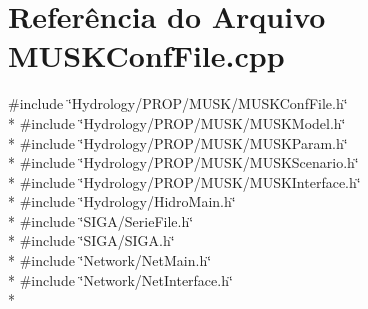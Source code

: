 \section{Referência do Arquivo M\+U\+S\+K\+Conf\+File.\+cpp}
\label{_m_u_s_k_conf_file_8cpp}
{\ttfamily \#include \char`\"{}Hydrology/\+P\+R\+O\+P/\+M\+U\+S\+K/\+M\+U\+S\+K\+Conf\+File.\+h\char`\"{}}\\*
{\ttfamily \#include \char`\"{}Hydrology/\+P\+R\+O\+P/\+M\+U\+S\+K/\+M\+U\+S\+K\+Model.\+h\char`\"{}}\\*
{\ttfamily \#include \char`\"{}Hydrology/\+P\+R\+O\+P/\+M\+U\+S\+K/\+M\+U\+S\+K\+Param.\+h\char`\"{}}\\*
{\ttfamily \#include \char`\"{}Hydrology/\+P\+R\+O\+P/\+M\+U\+S\+K/\+M\+U\+S\+K\+Scenario.\+h\char`\"{}}\\*
{\ttfamily \#include \char`\"{}Hydrology/\+P\+R\+O\+P/\+M\+U\+S\+K/\+M\+U\+S\+K\+Interface.\+h\char`\"{}}\\*
{\ttfamily \#include \char`\"{}Hydrology/\+Hidro\+Main.\+h\char`\"{}}\\*
{\ttfamily \#include \char`\"{}S\+I\+G\+A/\+Serie\+File.\+h\char`\"{}}\\*
{\ttfamily \#include \char`\"{}S\+I\+G\+A/\+S\+I\+G\+A.\+h\char`\"{}}\\*
{\ttfamily \#include \char`\"{}Network/\+Net\+Main.\+h\char`\"{}}\\*
{\ttfamily \#include \char`\"{}Network/\+Net\+Interface.\+h\char`\"{}}\\*

